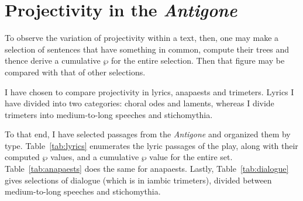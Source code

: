\documentclass{article}
\newcommand{\FN}{\mathsf}
\begin{document}
\section{Projectivity in the \emph{Antigone}}

To observe the variation of projectivity within a text, then, one may make a
selection of sentences that have something in common, compute their trees and
thence derive a cumulative \ensuremath{\FN{\wp}} for the entire selection. Then that figure
may be compared with that of other selections.

I have chosen to compare projectivity in lyrics, anapaests and trimeters. Lyrics
I have divided into two categories: choral odes and laments, whereas I divide
trimeters into medium-to-long speeches and stichomythia.

To that end, I have selected passages from the \emph{Antigone} and organized
them by type. Table~\ref{tab:lyrics} enumerates the lyric passages of the play,
along with their computed \ensuremath{\FN{\wp}} values, and a cumulative \ensuremath{\FN{\wp}} value for the
entire set. Table~\ref{tab:anapaests} does the same for anapaests. Lastly,
Table~\ref{tab:dialogue} gives selections of dialogue (which is in iambic
trimeters), divided between medium-to-long speeches and stichomythia.
\end{document}
